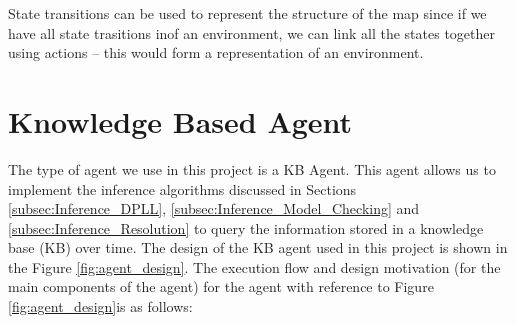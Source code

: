 State transitions can be used to represent the structure of the map since if we have all state trasitions inof an environment, we can link all the states together using actions -- this would form a representation of an environment. 



\section{Knowledge Based Agent}
\label{sec:kb_agentz}

The type of agent we use in this project is a KB Agent. This agent allows us to implement the inference algorithms discussed in Sections \ref{subsec:Inference_DPLL}, \ref{subsec:Inference_Model_Checking} and \ref{subsec:Inference_Resolution} to query the information stored in a knowledge base (KB) over time. The design of the KB agent used in this project is shown in the Figure \ref{fig:agent_design}.
The execution flow and design motivation (for the main components of the agent) for the agent with reference to Figure \ref{fig:agent_design}is as follows:

